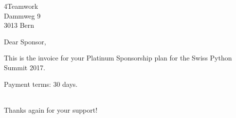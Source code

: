 \documentclass[SN,11pt,enlargefirstpage=true,sps]{scrlttr2}
\begin{document}
\begin{letter}{4Teamwork\\Dammweg 9\\3013 Bern}

  \opening{Dear Sponsor,}

  This is the invoice for your Platinum Sponsorship plan for the Swiss Python Summit 2017.

  \begin{invoice}{0.0}%
  \end{invoice}

  Payment terms: 30 days.

  \closing{\\Thanks again for your support!}

\end{letter}
\end{document}

